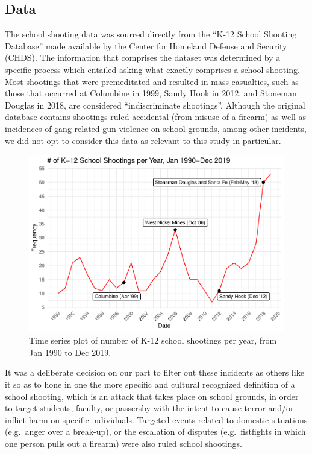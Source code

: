 \documentclass[12pt]{article}
\begin{document}
\hypertarget{data}{%
\subsection{Data}\label{data}}

The school shooting data was sourced directly from the ``K-12 School Shooting Database'' made available by the Center for Homeland Defense and Security (CHDS). The information that comprises the dataset was determined by a specific process which entailed asking what exactly comprises a school shooting. Most shootings that were premeditated and resulted in mass casualties, such as those that occurred at Columbine in 1999, Sandy Hook in 2012, and Stoneman Douglas in 2018, are considered ``indiscriminate shootings''. Although the original database contains shootings ruled accidental (from misuse of a firearm) as well as incidences of gang-related gun violence on school grounds, among other incidents, we did not opt to consider this data as relevant to this study in particular.

\begin{figure}
\centering
\includegraphics{JStevenRaquel_STATS295_Final_files/figure-latex/ts-plot-1990-2019-1.pdf}
\caption{\label{fig:ts-plot-1990-2019}Time series plot of number of K-12 school shootings per year, from Jan 1990 to Dec 2019.}
\end{figure}

It was a deliberate decision on our part to filter out these incidents as others like it so as to hone in one the more specific and cultural recognized definition of a school shooting, which is an attack that takes place on school grounds, in order to target students, faculty, or passersby with the intent to cause terror and/or inflict harm on specific individuals. Targeted events related to domestic situations (e.g.~anger over a break-up), or the escalation of disputes (e.g.~fistfights in which one person pulls out a firearm) were also ruled school shootings.
\end{document}
